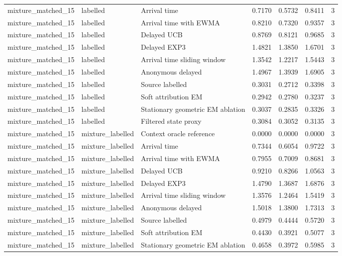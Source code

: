 \begin{tabular}{llllllr}
mixture\_matched\_15 & labelled & Arrival time & 0.7170 & 0.5732 & 0.8411 & 3 \\
mixture\_matched\_15 & labelled & Arrival time with EWMA & 0.8210 & 0.7320 & 0.9357 & 3 \\
mixture\_matched\_15 & labelled & Delayed UCB & 0.8769 & 0.8121 & 0.9685 & 3 \\
mixture\_matched\_15 & labelled & Delayed EXP3 & 1.4821 & 1.3850 & 1.6701 & 3 \\
mixture\_matched\_15 & labelled & Arrival time sliding window & 1.3542 & 1.2217 & 1.5443 & 3 \\
mixture\_matched\_15 & labelled & Anonymous delayed & 1.4967 & 1.3939 & 1.6905 & 3 \\
mixture\_matched\_15 & labelled & Source labelled & 0.3031 & 0.2712 & 0.3398 & 3 \\
mixture\_matched\_15 & labelled & Soft attribution EM & 0.2942 & 0.2780 & 0.3237 & 3 \\
mixture\_matched\_15 & labelled & Stationary geometric EM ablation & 0.3037 & 0.2835 & 0.3326 & 3 \\
mixture\_matched\_15 & labelled & Filtered state proxy & 0.3084 & 0.3052 & 0.3135 & 3 \\
mixture\_matched\_15 & mixture\_labelled & Context oracle reference & 0.0000 & 0.0000 & 0.0000 & 3 \\
mixture\_matched\_15 & mixture\_labelled & Arrival time & 0.7344 & 0.6054 & 0.9722 & 3 \\
mixture\_matched\_15 & mixture\_labelled & Arrival time with EWMA & 0.7955 & 0.7009 & 0.8681 & 3 \\
mixture\_matched\_15 & mixture\_labelled & Delayed UCB & 0.9210 & 0.8266 & 1.0563 & 3 \\
mixture\_matched\_15 & mixture\_labelled & Delayed EXP3 & 1.4790 & 1.3687 & 1.6876 & 3 \\
mixture\_matched\_15 & mixture\_labelled & Arrival time sliding window & 1.3576 & 1.2464 & 1.5419 & 3 \\
mixture\_matched\_15 & mixture\_labelled & Anonymous delayed & 1.5018 & 1.3800 & 1.7313 & 3 \\
mixture\_matched\_15 & mixture\_labelled & Source labelled & 0.4979 & 0.4444 & 0.5720 & 3 \\
mixture\_matched\_15 & mixture\_labelled & Soft attribution EM & 0.4430 & 0.3921 & 0.5077 & 3 \\
mixture\_matched\_15 & mixture\_labelled & Stationary geometric EM ablation & 0.4658 & 0.3972 & 0.5985 & 3 \\

\end{tabular}
